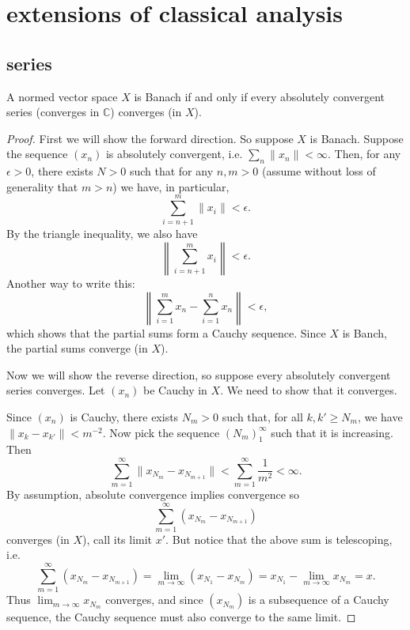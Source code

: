 \documentclass[12pt]{article}
\begin{document}
\section{extensions of classical analysis} %
\begin{refsection}

\subsection{series} %

\begin{proposition}
\label{prop_absolute_convergence_implies_convergence}
	A normed vector space $X$ is Banach if and only if every absolutely convergent series (converges in $\mathbb{C}$) converges (in $X$).
\end{proposition}
\begin{proof}
	First we will show the forward direction. So suppose $X$ is Banach. Suppose the sequence $(x_n)$ is absolutely convergent, i.e. $\sum_n \|x_n\| < \infty$. Then, for any $\epsilon>0$, there exists $N>0$ such that for any $n,m>0$ (assume without loss of generality that $m>n$) we have, in particular, 
	\begin{equation*}
		\sum_{i=n+1}^m \|x_i\| < \epsilon.
	\end{equation*}
	By the triangle inequality, we also have 
	\begin{equation*}
		\left\| \sum_{i=n+1}^m x_i \right\| < \epsilon.
	\end{equation*}
	Another way to write this:
	\begin{equation*}
		\left\| \sum_{i=1}^m x_n - \sum_{i=1}^n x_n \right\| < \epsilon,
	\end{equation*}
	which shows that the partial sums form a Cauchy sequence. Since $X$ is Banch, the partial sums converge (in $X$).

	Now we will show the reverse direction, so suppose every absolutely convergent series converges. Let $(x_n)$ be Cauchy in $X$. We need to show that it converges.

	Since $(x_n)$ is Cauchy, there exists $N_m>0$ such that, for all $k, k'\geq N_m$, we have $\|x_k-x_{k'}\|<m^{-2}$. Now pick the sequence $(N_m)_1^\infty$ such that it is increasing. Then 
	\begin{equation*}
		\sum_{m=1}^\infty \|x_{N_m} - x_{N_{m+1}} \| < \sum_{m=1}^\infty \frac{1}{m^2} < \infty.
	\end{equation*}
	By assumption, absolute convergence implies convergence so 
	\begin{equation*}
		\sum_{m=1}^\infty (x_{N_m} - x_{N_{m+1}})
	\end{equation*}
	converges (in $X$), call its limit $x'$. But notice that the above sum is telescoping, i.e.
	\begin{equation*}
		\sum_{m=1}^\infty (x_{N_m} - x_{N_{m+1}}) = \lim_{m\to\infty}(x_{N_1} - x_{N_m})=x_{N_1} - \lim_{m\to\infty}x_{N_m} = x.
	\end{equation*}
	Thus $\lim_{m\to\infty} x_{N_m}$ converges, and since $(x_{N_m})$ is a subsequence of a Cauchy sequence, the Cauchy sequence must also converge to the same limit.
\end{proof}


\end{refsection}
\end{document}
